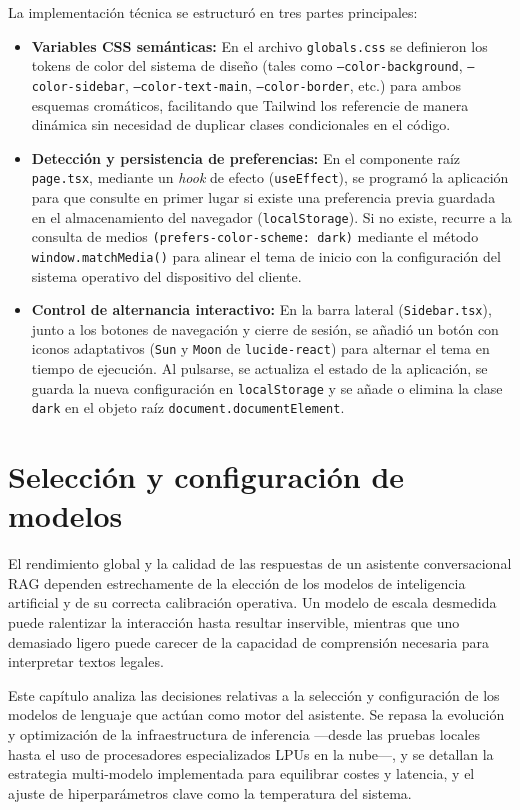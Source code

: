 \documentclass[12pt,a4paper,oneside]{report}
\begin{document}
La implementación técnica se estructuró en tres partes principales:
\begin{itemize}
    \item \textbf{Variables CSS semánticas:} En el archivo \texttt{globals.css} se definieron los tokens de color del sistema de diseño (tales como \texttt{--color-background}, \texttt{--color-sidebar}, \texttt{--color-text-main}, \texttt{--color-border}, etc.) para ambos esquemas cromáticos, facilitando que Tailwind los referencie de manera dinámica sin necesidad de duplicar clases condicionales en el código.
    \item \textbf{Detección y persistencia de preferencias:} En el componente raíz \texttt{page.tsx}, mediante un \textit{hook} de efecto (\texttt{useEffect}), se programó la aplicación para que consulte en primer lugar si existe una preferencia previa guardada en el almacenamiento del navegador (\texttt{localStorage}). Si no existe, recurre a la consulta de medios \texttt{(prefers-\allowbreak color-\allowbreak scheme: \allowbreak dark)} mediante el método \texttt{window.\allowbreak matchMedia()} para alinear el tema de inicio con la configuración del sistema operativo del dispositivo del cliente.
    \item \textbf{Control de alternancia interactivo:} En la barra lateral (\texttt{Sidebar.tsx}), junto a los botones de navegación y cierre de sesión, se añadió un botón con iconos adaptativos (\texttt{Sun} y \texttt{Moon} de \texttt{lucide-react}) para alternar el tema en tiempo de ejecución. Al pulsarse, se actualiza el estado de la aplicación, se guarda la nueva configuración en \texttt{localStorage} y se añade o elimina la clase \texttt{dark} en el objeto raíz \texttt{document.documentElement}.
\end{itemize}

\chapter{Selección y configuración de modelos}

El rendimiento global y la calidad de las respuestas de un asistente conversacional RAG dependen estrechamente de la elección de los modelos de inteligencia artificial y de su correcta calibración operativa. Un modelo de escala desmedida puede ralentizar la interacción hasta resultar inservible, mientras que uno demasiado ligero puede carecer de la capacidad de comprensión necesaria para interpretar textos legales.

Este capítulo analiza las decisiones relativas a la selección y configuración de los modelos de lenguaje que actúan como motor del asistente. Se repasa la evolución y optimización de la infraestructura de inferencia —desde las pruebas locales hasta el uso de procesadores especializados LPUs en la nube—, y se detallan la estrategia multi-modelo implementada para equilibrar costes y latencia, y el ajuste de hiperparámetros clave como la temperatura del sistema.
\end{document}

